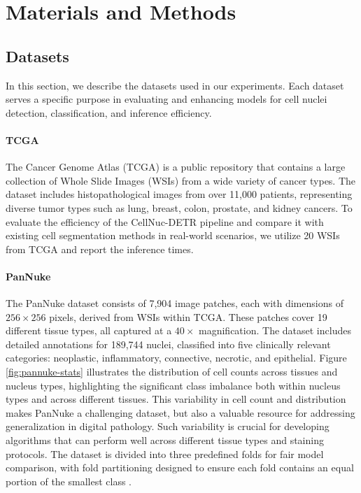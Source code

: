 \section{Materials and Methods}
\label{sec:methods}

\subsection{Datasets}
\label{sec:methods:datasets}

In this section, we describe the datasets used in our experiments. Each dataset serves a specific purpose in evaluating and enhancing models for cell nuclei detection, classification, and inference efficiency.

\paragraph{TCGA} The Cancer Genome Atlas (TCGA) is a public repository that contains a large collection of Whole Slide Images (WSIs) from a wide variety of cancer types. The dataset includes histopathological images from over 11,000 patients, representing diverse tumor types such as lung, breast, colon, prostate, and kidney cancers. To evaluate the efficiency of the CellNuc-DETR pipeline and compare it with existing cell segmentation methods in real-world scenarios, we utilize 20 WSIs from TCGA and report the inference times. 

\paragraph{PanNuke} 
The PanNuke dataset \cite{gamper2020pannuke} consists of 7,904 image patches, each with dimensions of $256 \times 256$ pixels, derived from WSIs within TCGA. These patches cover 19 different tissue types, all captured at a $40\times$ magnification. The dataset includes detailed annotations for 189,744 nuclei, classified into five clinically relevant categories: neoplastic, inflammatory, connective, necrotic, and epithelial. Figure \ref{fig:pannuke-stats} illustrates the distribution of cell counts across tissues and nucleus types, highlighting the significant class imbalance both within nucleus types and across different tissues. This variability in cell count and distribution makes PanNuke a challenging dataset, but also a valuable resource for addressing generalization in digital pathology. Such variability is crucial for developing algorithms that can perform well across different tissue types and staining protocols. The dataset is divided into three predefined folds for fair model comparison, with fold partitioning designed to ensure each fold contains an equal portion of the smallest class \cite{gamper2020pannuke}.

